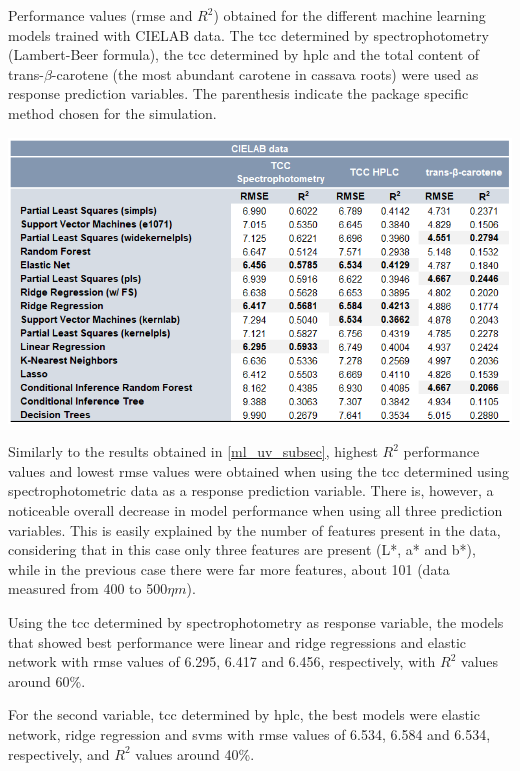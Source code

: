 \begin{table}[h]
	\centering
	\caption{Performance values (\gls{rmse} and $R^{2}$) obtained for the different machine learning models trained with CIELAB data. The \gls{tcc} determined by spectrophotometry (Lambert-Beer formula), the \gls{tcc} determined by \gls{hplc} and the total content of trans-$\beta$-carotene (the most abundant carotene in cassava roots) were used as response prediction variables. The parenthesis indicate the package specific method chosen for the simulation.}	
	\includegraphics[width=1\linewidth]{Imagens/Case_study/CIELAB_table}
	\label{CIELAB_table}	
\end{table}


Similarly to the results obtained in \autoref{ml_uv_subsec}, highest $R^{2}$ performance values and lowest \gls{rmse} values were obtained when using the \gls{tcc} determined using spectrophotometric data as a response prediction variable. There is, however, a noticeable overall decrease in model performance when using all three prediction variables. This is easily explained by the number of features present in the data, considering that in this case only three features are present (L*, a* and b*), while in the previous case there were far more features, about 101 (data measured from 400 to 500$\eta m$).

Using the \gls{tcc} determined by spectrophotometry as response variable, the models that showed best performance were linear and ridge regressions and elastic network with \gls{rmse} values of 6.295, 6.417 and 6.456, respectively, with $R^{2}$ values around 60\%. 

For the second variable, \gls{tcc} determined by \gls{hplc}, the best models were elastic network, ridge regression and \gls{svm}s with \gls{rmse} values of 6.534, 6.584 and 6.534, respectively, and $R^{2}$ values around 40\%. 


